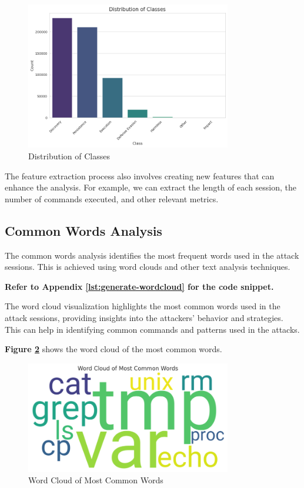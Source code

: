         \begin{figure}[h]
            \centering
            \includegraphics[width=0.8\textwidth]{../figures/plots/section1/distribution_of_classes.png}
            \caption{Distribution of Classes}
            \label{fig:class-distribution}
        \end{figure}

        The feature extraction process also involves creating new features that can enhance the analysis. For example, we can extract the length of each session, the number of commands executed, and other relevant metrics.

    \subsection{Common Words Analysis}
    
        The common words analysis identifies the most frequent words used in the attack sessions. This is achieved using word clouds and other text analysis techniques.
            
        \textbf{Refer to Appendix \ref{lst:generate-wordcloud} for the code snippet.}

        The word cloud visualization highlights the most common words used in the attack sessions, providing insights into the attackers' behavior and strategies. This can help in identifying common commands and patterns used in the attacks.

        \textbf{Figure \ref{fig:word-cloud}} shows the word cloud of the most common words.

        \begin{figure}[h]
            \centering
            \includegraphics[width=0.8\textwidth]{../figures/plots/section1/word_cloud_of_most_common_words.png}
            \caption{Word Cloud of Most Common Words}
            \label{fig:word-cloud}
        \end{figure}

